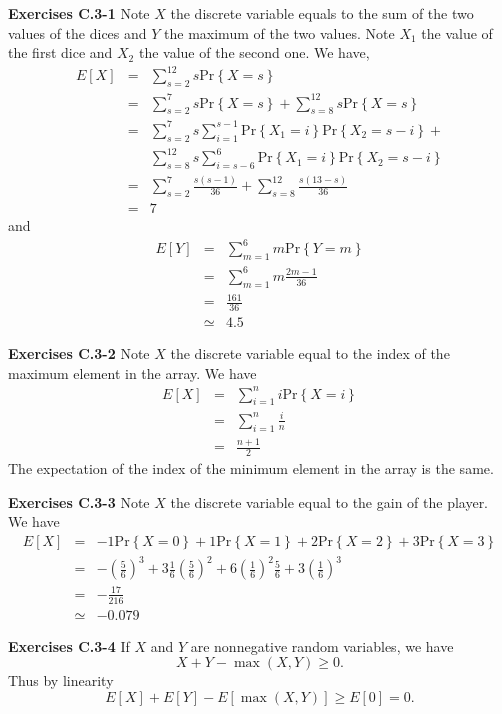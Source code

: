 \documentclass[a4paper,12pt]{article}
\newcommand{\newpar}[1]
{\bigskip \noindent \textbf{Exercises #1} \newline}
\newcommand{\prob}[1]{\mathrm{Pr}\left\{ #1 \right\}}
\begin{document}
 \newpar{C.3-1}
Note $X$ the discrete variable equals to the sum of the two values of
the dices and $Y$ the maximum of the two values.  Note $X_1$ the value
of the first dice and $X_2$ the value of the second one.  We have,
\begin{eqnarray*}
  E[X] &=& \sum_{s=2}^{12} s \prob{X=s} \\
  &=& \sum_{s=2}^7 s \prob{X=s} + \sum_{s=8}^{12} s \prob{X=s} \\
  &=& \sum_{s=2}^7 s \sum_{i=1}^{s-1} \prob{X_1 = i}\prob{X_2 = s-i} +
  \\ && \sum_{s=8}^{12} s \sum_{i=s-6}^6\prob{X_1 = i} \prob{X_2 =
    s-i} \\
  &=& \sum_{s=2}^7 \frac{s(s-1)}{36} + \sum_{s=8}^{12}
  \frac{s(13-s)}{36} \\
  &=& 7
\end{eqnarray*}
and
\begin{eqnarray*}
  E[Y] &=& \sum_{m=1}^6 m \prob{Y=m} \\
  &=& \sum_{m=1}^6 m \frac{2m-1}{36} \\
  &=& \frac{161}{36} \\
  &\simeq& 4.5
\end{eqnarray*}

\newpar{C.3-2}
Note $X$ the discrete variable equal to the index of the maximum
element in the array.  We have
\begin{eqnarray*}
  E[X] &=& \sum_{i=1}^n i \prob{X = i} \\
  &=& \sum_{i=1}^n \frac{i}{n} \\
  &=& \frac{n+1}{2}
\end{eqnarray*}
The expectation of the index of the minimum element in the array is
the same.

\newpar{C.3-3}
Note $X$ the discrete variable equal to the gain of the player.  We
have
\begin{eqnarray*}
  E[X] &=& -1 \prob{X = 0} + 1 \prob{X = 1} + 2 \prob{X = 2} +
  3 \prob{X = 3} \\
  &=& - \left(\frac{5}{6}\right)^3 + 3\frac{1}{6}
  \left(\frac{5}{6}\right)^2 +
  6 \left(\frac{1}{6}\right)^2 \frac{5}{6} +
  3 \left(\frac{1}{6}\right)^3 \\
  &=& -\frac{17}{216} \\
  &\simeq& - 0.079
\end{eqnarray*}

\newpar{C.3-4}
If $X$ and $Y$ are nonnegative random variables, we have
\[ X + Y - \max(X,Y) \ge 0.\]
Thus by linearity
\[ E[X] + E[Y] - E[\max(X,Y)] \ge E[0] = 0.\]
\end{document}
